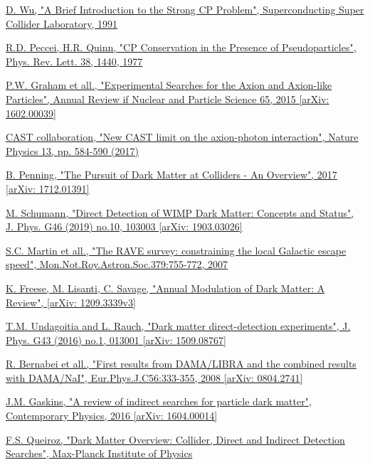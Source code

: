 \documentclass[a4paper, 10pt, openright]{report}
\begin{document}
\begin{thebibliography}{1}
\href{https://www.osti.gov/servlets/purl/6260191}{D. Wu,
"A Brief Introduction to the Strong CP Problem",
Superconducting Super Collider Laboratory, 1991
}

\href{https://journals.aps.org/prl/abstract/10.1103/PhysRevLett.38.1440}{R.D. Peccei, H.R. Quinn,
"CP Conservation in the Presence of Pseudoparticles",
Phys. Rev. Lett. 38, 1440, 1977
}

\href{https://arxiv.org/abs/1602.00039}{P.W. Graham et all.,
"Experimental Searches for the Axion and Axion-like Particles",
Annual Review if Nuclear and Particle Science 65, 2015 [arXiv: 1602.00039]
}

\href{https://www.nature.com/articles/nphys4109}{CAST collaboration,
"New CAST limit on the axion-photon interaction",
Nature Physics 13, pp. 584-590 (2017)
}

\href{https://arxiv.org/abs/1712.01391}{B. Penning,
"The Pursuit of Dark Matter at Colliders - An Overview",
2017 [arXiv: 1712.01391]
}

\href{https://arxiv.org/abs/1903.03026}{M. Schumann,
"Direct Detection of WIMP Dark Matter: Concepts and Status",
J. Phys. G46 (2019) no.10, 103003 [arXiv: 1903.03026]
}

\href{https://arxiv.org/abs/astro-ph/0611671}{S.C. Martin et all.,
"The RAVE survey: constraining the local Galactic escape speed",
Mon.Not.Roy.Astron.Soc.379:755-772, 2007
}

\href{https://arxiv.org/abs/1209.3339}{K. Freese, M. Lisanti, C. Savage,
"Annual Modulation of Dark Matter: A Review",
[arXiv: 1209.3339v3]
}

\href{https://arxiv.org/abs/1509.08767}{T.M. Undagoitia and L. Rauch,
"Dark matter direct-detection experiments",
J. Phys. G43 (2016) no.1, 013001 [arXiv: 1509.08767]
}

\href{https://arxiv.org/abs/0804.2741}{R. Bernabei et all.,
"First results from DAMA/LIBRA and the combined results with DAMA/NaI",
Eur.Phys.J.C56:333-355, 2008 [arXiv: 0804.2741]
}

\href{https://arxiv.org/pdf/1604.00014}{J.M. Gaskins,
"A review of indirect searches for particle dark matter",
Contemporary Physics, 2016 [arXiv: 1604.00014]
}

\href{http://inspirehep.net/record/1466249/files/1589812_427-436.pdf}{F.S. Queiroz,
"Dark Matter Overview: Collider, Direct and Indirect Detection Searches",
Max-Planck Institute of Physics
}


\end{thebibliography}
\end{document}
